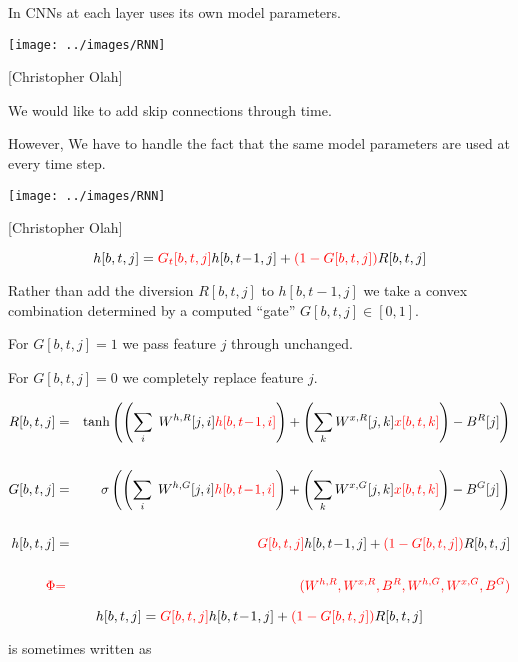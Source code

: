 {\vfill
In CNNs {\color{red} at each layer uses its own model parameters.}


\centerline{\texttt{[image: ../images/RNN]}}
\centerline{{\large [Christopher Olah]}}

\vfill
We would like to add {\color{red} skip connections through time}.

\vfill
However, We have to handle the fact that the same model parameters are used at every time step.



\centerline{\texttt{[image: ../images/RNN]}}
\centerline{{\large [Christopher Olah]}}

$$h[b,t,j] =  {\color{red} G_t[b,t,j]}h[b,t\!-\!1,j] + {\color{red} (1-G[b,t,j])}R[b,t,j]$$

\vfill
Rather than add the diversion $R[b,t,j]$ to $h[b,t\!-\!1,j]$ we take a convex combination determined by a computed ``gate'' $G[b,t,j] \in [0,1]$.

\vfill
For $G[b,t,j] =1$ we pass feature $j$ through unchanged.

For $G[b,t,j] = 0$ we completely replace feature $j$.


{\huge
\begin{eqnarray*}
R[b,t,j] & = & \mathrm{tanh}\left(\left(\sum_i\;W^{h,R}[j,i]{\color{red} h[b,t\!-\!1,i]}\right) + \left(\sum_k W^{x,R}[j,k]{\color{red} x[b,t,k]}\right) - B^R[j]\right) \\
\\
G[b,t,j] & = & \sigma\left(\left(\sum_i\;W^{h,G}[j,i]{\color{red} h[b,t\!-\!1,i]}\right) + \left(\sum_k W^{x,G}[j,k]{\color{red} x[b,t,k]}\right) - B^G[j]\right) \\
\\
h[b,t,j] & = & {\color{red} G[b,t,j]}h[b,t\!-\!1,j] + {\color{red} (1-G[b,t,j])}R[b,t,j] \\
\\
{\color{red} \Phi} & {\color{red} =} & {\color{red} (W^{h,R},W^{x,R},B^R,W^{h,G},W^{x,G},B^G)}
\end{eqnarray*}
}


$$h[b,t,j] =  {\color{red} G[b,t,j]}h[b,t\!-\!1,j] + {\color{red} (1-G[b,t,j])}R[b,t,j]$$

\vfill
is sometimes written as

}
